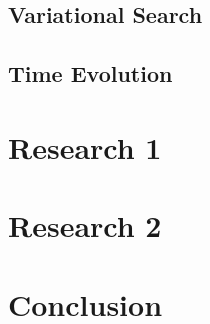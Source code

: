 \documentclass[a4paper,oneside,12pt]{hwthesis}
\newcommand*{\chappath}{../../include/chapters}
\newcommand*{\refpath}{../../include/refs}
\begin{document}
\section{Variational Search}



\section{Time Evolution}

\chapter{Research 1}

\chapter{Research 2}

\chapter{Conclusion}



\end{document}

